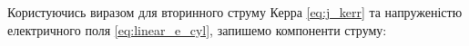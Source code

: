 Користуючись виразом для вторинного струму Керра \eqref{eq:j_kerr} та 
напруженістю електричного поля \eqref{eq:linear_e_cyl}, запишемо компоненти 
струму:

%
%
